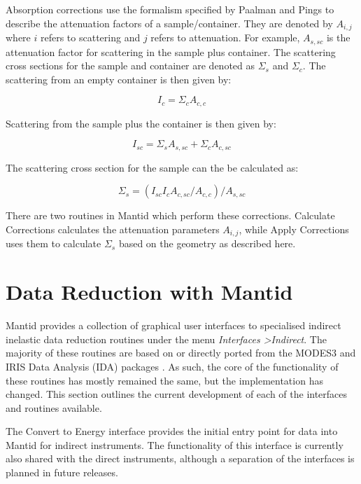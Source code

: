\documentclass[paper=a4, fontsize=11pt]{scrartcl}	%
\numberwithin{equation}{section}															%
\numberwithin{figure}{section}																%
\numberwithin{table}{section}																%
\begin{document}
Absorption corrections use the formalism specified by Paalman and Pings \cite{hhpaalman1962} to describe the attenuation factors of a sample/container. They are denoted by $A_{i,j}$ where $i$ refers to scattering and $j$ refers to attenuation. For example, $A_{s,sc}$ is the attenuation factor for scattering in the sample plus container. The scattering cross sections for the sample and container are denoted as $\Sigma_s$ and $\Sigma_c$. The scattering from an empty container is then given by:

\begin{equation}
I_c = \Sigma_c A_{c,c}
\end{equation}

Scattering from the sample plus the container is then given by:

\begin{equation}
I_{sc} = \Sigma_s A_{s,sc} + \Sigma_c A_{c,sc}
\end{equation}

The scattering cross section for the sample can the be calculated as:

\begin{equation}
\Sigma_s = (I_{sc}I_cA_{c,sc}/A_{c,c}) / A_{s,sc}
\end{equation}

There are two routines in Mantid which perform these corrections. Calculate Corrections calculates the attenuation parameters $A_{i,j}$, while Apply Corrections uses them to calculate $\Sigma_s$ based on the geometry as described here.

\section{Data Reduction with Mantid}
Mantid provides a collection of graphical user interfaces to specialised indirect inelastic data reduction routines under the menu \textit{Interfaces \textgreater Indirect}. The majority of these routines are based on or directly ported from the MODES3 and IRIS Data Analysis (IDA) packages \cite{wshowells2010}. As such, the core of the functionality of these routines has mostly remained the same, but the implementation has changed. This section outlines the current development of each of the interfaces and routines available.

The Convert to Energy interface provides the initial entry point for data into Mantid for indirect instruments. The functionality of this interface is currently also shared with the direct instruments, although a separation of the interfaces is planned in future releases.
\end{document}
